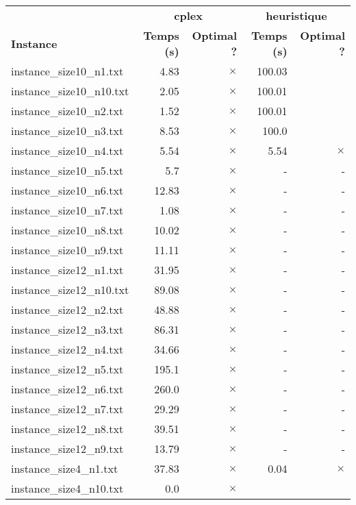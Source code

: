 \documentclass{article}
\begin{document}
\begin{center}
\renewcommand{\arraystretch}{1.4}
 \begin{tabular}{lrrrr}
	\hline
 & \multicolumn{2}{c}{\textbf{cplex}} & \multicolumn{2}{c}{\textbf{heuristique}}\\
\textbf{Instance}  & \textbf{Temps (s)} & \textbf{Optimal ?}  & \textbf{Temps (s)} & \textbf{Optimal ?} \\\hline

instance\_size10\_n1.txt & 4.83 & 
$\times$
 & 100.03 & 
\\
instance\_size10\_n10.txt & 2.05 & 
$\times$
 & 100.01 & 
\\
instance\_size10\_n2.txt & 1.52 & 
$\times$
 & 100.01 & 
\\
instance\_size10\_n3.txt & 8.53 & 
$\times$
 & 100.0 & 
\\
instance\_size10\_n4.txt & 5.54 & 
$\times$
 & 5.54 & 
$\times$
\\
instance\_size10\_n5.txt & 5.7 & 
$\times$
 & - & - 
\\
instance\_size10\_n6.txt & 12.83 & 
$\times$
 & - & - 
\\
instance\_size10\_n7.txt & 1.08 & 
$\times$
 & - & - 
\\
instance\_size10\_n8.txt & 10.02 & 
$\times$
 & - & - 
\\
instance\_size10\_n9.txt & 11.11 & 
$\times$
 & - & - 
\\
instance\_size12\_n1.txt & 31.95 & 
$\times$
 & - & - 
\\
instance\_size12\_n10.txt & 89.08 & 
$\times$
 & - & - 
\\
instance\_size12\_n2.txt & 48.88 & 
$\times$
 & - & - 
\\
instance\_size12\_n3.txt & 86.31 & 
$\times$
 & - & - 
\\
instance\_size12\_n4.txt & 34.66 & 
$\times$
 & - & - 
\\
instance\_size12\_n5.txt & 195.1 & 
$\times$
 & - & - 
\\
instance\_size12\_n6.txt & 260.0 & 
$\times$
 & - & - 
\\
instance\_size12\_n7.txt & 29.29 & 
$\times$
 & - & - 
\\
instance\_size12\_n8.txt & 39.51 & 
$\times$
 & - & - 
\\
instance\_size12\_n9.txt & 13.79 & 
$\times$
 & - & - 
\\
instance\_size4\_n1.txt & 37.83 & 
$\times$
 & 0.04 & 
$\times$
\\
instance\_size4\_n10.txt & 0.0 & 
$\times$

\end{tabular}
\end{center}
\end{document}

